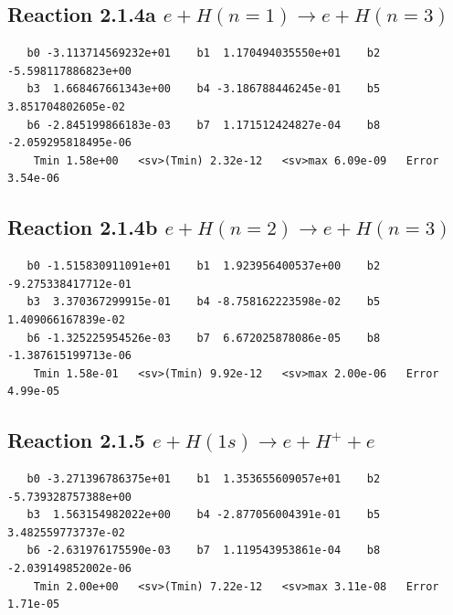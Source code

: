 \documentclass[12pt,dvipdfmx]{article}
\begin{document}
\newpage
\subsection{
Reaction 2.1.4a $   e + H(n=1) \rightarrow e + H(n=3)$}


\begin{small}\begin{verbatim}
   b0 -3.113714569232e+01    b1  1.170494035550e+01    b2 -5.598117886823e+00
   b3  1.668467661343e+00    b4 -3.186788446245e-01    b5  3.851704802605e-02
   b6 -2.845199866183e-03    b7  1.171512424827e-04    b8 -2.059295818495e-06
    Tmin 1.58e+00   <sv>(Tmin) 2.32e-12   <sv>max 6.09e-09   Error 3.54e-06
\end{verbatim}\end{small}

\newpage
\subsection{
Reaction 2.1.4b $   e + H(n=2) \rightarrow e + H(n=3)$}


\begin{small}\begin{verbatim}
   b0 -1.515830911091e+01    b1  1.923956400537e+00    b2 -9.275338417712e-01
   b3  3.370367299915e-01    b4 -8.758162223598e-02    b5  1.409066167839e-02
   b6 -1.325225954526e-03    b7  6.672025878086e-05    b8 -1.387615199713e-06
    Tmin 1.58e-01   <sv>(Tmin) 9.92e-12   <sv>max 2.00e-06   Error 4.99e-05
\end{verbatim}\end{small}

\newpage
\subsection{
Reaction 2.1.5 $   e + H(1s) \rightarrow e + H^+ + e$}


\begin{small}\begin{verbatim}
   b0 -3.271396786375e+01    b1  1.353655609057e+01    b2 -5.739328757388e+00
   b3  1.563154982022e+00    b4 -2.877056004391e-01    b5  3.482559773737e-02
   b6 -2.631976175590e-03    b7  1.119543953861e-04    b8 -2.039149852002e-06
    Tmin 2.00e+00   <sv>(Tmin) 7.22e-12   <sv>max 3.11e-08   Error 1.71e-05
\end{verbatim}\end{small}
\end{document}
